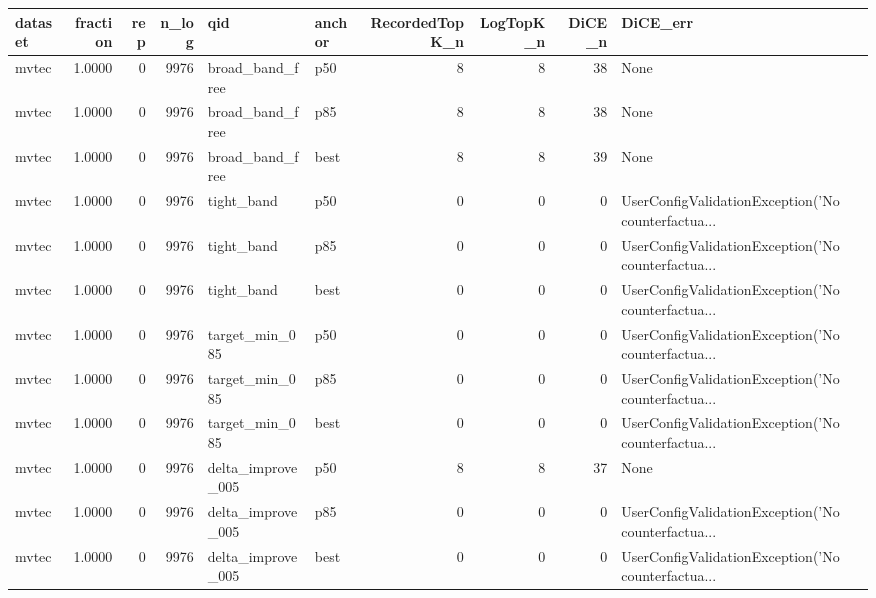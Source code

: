 \begin{tabular}{lrrrllrrrl}
\toprule
 dataset &  fraction &  rep &  n\_log &                  qid & anchor &  RecordedTopK\_n &  LogTopK\_n &  DiCE\_n &                                           DiCE\_err \\
\midrule
   mvtec &    1.0000 &    0 &   9976 &      broad\_band\_free &    p50 &               8 &          8 &      38 &                                               None \\
   mvtec &    1.0000 &    0 &   9976 &      broad\_band\_free &    p85 &               8 &          8 &      38 &                                               None \\
   mvtec &    1.0000 &    0 &   9976 &      broad\_band\_free &   best &               8 &          8 &      39 &                                               None \\
   mvtec &    1.0000 &    0 &   9976 &           tight\_band &    p50 &               0 &          0 &       0 & UserConfigValidationException('No counterfactua... \\
   mvtec &    1.0000 &    0 &   9976 &           tight\_band &    p85 &               0 &          0 &       0 & UserConfigValidationException('No counterfactua... \\
   mvtec &    1.0000 &    0 &   9976 &           tight\_band &   best &               0 &          0 &       0 & UserConfigValidationException('No counterfactua... \\
   mvtec &    1.0000 &    0 &   9976 &       target\_min\_085 &    p50 &               0 &          0 &       0 & UserConfigValidationException('No counterfactua... \\
   mvtec &    1.0000 &    0 &   9976 &       target\_min\_085 &    p85 &               0 &          0 &       0 & UserConfigValidationException('No counterfactua... \\
   mvtec &    1.0000 &    0 &   9976 &       target\_min\_085 &   best &               0 &          0 &       0 & UserConfigValidationException('No counterfactua... \\
   mvtec &    1.0000 &    0 &   9976 &    delta\_improve\_005 &    p50 &               8 &          8 &      37 &                                               None \\
   mvtec &    1.0000 &    0 &   9976 &    delta\_improve\_005 &    p85 &               0 &          0 &       0 & UserConfigValidationException('No counterfactua... \\
   mvtec &    1.0000 &    0 &   9976 &    delta\_improve\_005 &   best &               0 &          0 &       0 & UserConfigValidationException('No counterfactua... \\

\end{tabular}
